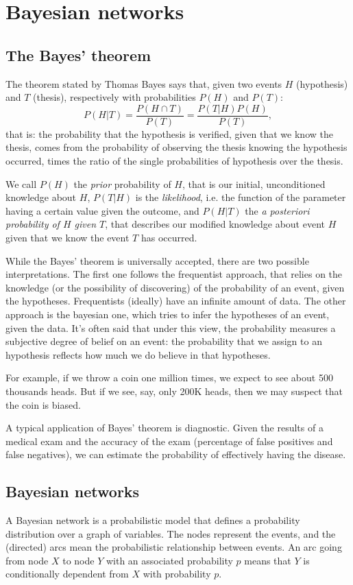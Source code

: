 \section{Bayesian networks}
\subsection{The Bayes' theorem}
The theorem stated by Thomas Bayes says that, given two events $H$ (hypothesis) and $T$ (thesis), respectively with probabilities $P(H)$ and $P(T)$:
\[ P(H|T) = \frac{P(H \cap T)}{P(T)} = \frac{P(T|H)P(H)}{P(T)}, \]
that is: the probability that the hypothesis is verified, given that we know the thesis, comes from the probability of observing the thesis knowing the hypothesis occurred, times the ratio of the single probabilities of hypothesis over the thesis.

We call $P(H)$ the \textit{prior} probability of $H$, that is our initial, unconditioned knowledge about $H$, $P(T|H)$ is the \textit{likelihood}, i.e. the function of the parameter having a certain value given the outcome, and $P(H|T)$ the \textit{a posteriori probability of $H$ given $T$}, that describes our modified knowledge about event $H$ given that we know the event $T$ has occurred.

While the Bayes' theorem is universally accepted, there are two possible interpretations. The first one follows the frequentist approach, that relies on the knowledge (or the possibility of discovering) of the probability of an event, given the hypotheses. Frequentists (ideally) have an infinite amount of data. The other approach is the bayesian one, which tries to infer the hypotheses of an event, given the data. It's often said that under this view, the probability measures a subjective degree of belief on an event: the probability that we assign to an hypothesis reflects how much we do believe in that hypotheses.

For example, if we throw a coin one million times, we expect to see about 500 thousands heads. But if we see, say, only 200K heads, then we may suspect that the coin is biased.

A typical application of Bayes' theorem is diagnostic. Given the results of a medical exam and the accuracy of the exam (percentage of false positives and false negatives), we can estimate the probability of effectively having the disease.

\subsection{Bayesian networks}
A Bayesian network is a probabilistic model that defines a probability distribution over a graph of variables. The nodes represent the events, and the (directed) arcs mean the probabilistic relationship between events. An arc going from node $X$ to node $Y$ with an associated probability $p$ means that $Y$ is conditionally dependent from $X$ with probability $p$.


